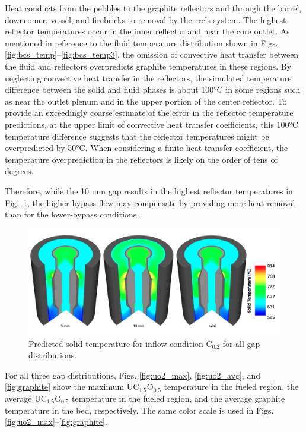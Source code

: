 Heat conducts from the pebbles to the graphite reflectors and through the barrel, downcomer, vessel, and firebricks to removal by the \gls{rrcls} system. The highest reflector temperatures occur in the inner reflector and near the core outlet. As mentioned in reference to the fluid temperature distribution shown in Figs. \ref{fig:bcs_temp}--\ref{fig:bcs_temp3}, the omission of convective heat transfer between the fluid and reflectors overpredicts graphite temperatures in these regions. By neglecting convective heat transfer in the reflectors, the simulated temperature difference between the solid and fluid phases is about 100\si{\celsius} in some regions such as near the outlet plenum and in the upper portion of the center reflector. To provide an exceedingly coarse estimate of the error in the reflector temperature predictions, at the upper limit of convective heat transfer coefficients, this 100\si{\celsius} temperature difference suggests that the reflector temperatures might be overpredicted by 50\si{\celsius}. When considering a finite heat transfer coefficient, the temperature overprediction in the reflectors is likely on the order of tens of degrees.

Therefore, while the 10 \si{\milli\meter} gap results in the highest reflector temperatures in Fig.\ \ref{fig:solid_noncore}, the higher bypass flow may compensate by providing more heat removal than for the lower-bypass conditions.

\begin{figure}[h!]
\centering
\includegraphics[height=0.4\linewidth]{figs/solid_temp_noncore.png}
\caption{Predicted solid temperature for inflow condition C$_\text{0.2}$ for all gap distributions.}
\label{fig:solid_noncore}
\end{figure}

For all three gap distributions, Figs. \ref{fig:uo2_max}, \ref{fig:uo2_avg}, and \ref{fig:graphite} show the maximum UC$_{1.5}$O$_{0.5}$ temperature in the fueled region, the average UC$_{1.5}$O$_{0.5}$ temperature in the fueled region, and the average graphite temperature in the bed, respectively. The same color scale is used in Figs. \ref{fig:uo2_max}--\ref{fig:graphite}.

